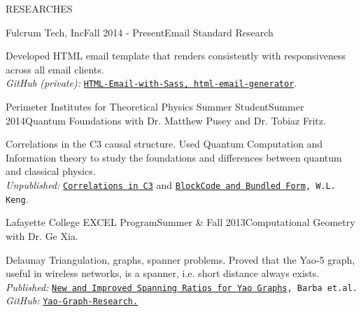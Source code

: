 \documentclass{resume} %
\begin{document}
\begin{rSection}{RESEARCHES}

\begin{rSubsection}{Fulcrum Tech, Inc}{Fall 2014 - Present}{Email Standard Research}{}
\item Developed HTML email template that renders consistently with responsiveness across all email clients.\\
{\em GitHub (private):} {\tt \href{https://github.com/kengz}{HTML-Email-with-Sass, html-email-generator}}.
\end{rSubsection}


\begin{rSubsection}{Perimeter Institutes for Theoretical Physics Summer Student}{Summer 2014}{Quantum Foundations with Dr. Matthew Pusey and Dr. Tobiaz Fritz.}{}
\item Correlations in the C3 causal structure. Used Quantum Computation and Information theory to study the foundations and differences between quantum and classical physics. \\
{\em Unpublished:} {\tt \href{https://github.com/kengz/Quantum-Foundations-Correlations/blob/master/Keng%20Correlations%20in%20C3.pdf}{Correlations in C3}} and {\tt \href{https://github.com/kengz/Quantum-Foundations-Correlations/blob/master/Keng%20blockcode.pdf}{BlockCode and Bundled Form}, W.L. Keng}.
\end{rSubsection}


\begin{rSubsection}{Lafayette College EXCEL Program}{Summer \& Fall 2013}{Computational Geometry with Dr. Ge Xia.}{}
\item Delaunay Triangulation, graphs, spanner problems. Proved that the Yao-5 graph, useful in wireless networks, is a spanner, i.e. short distance always exists.\\
{\em Published:} {\tt \href{http://arxiv.org/abs/1307.5829}{New and Improved Spanning Ratios for Yao Graphs}, Barba et.al.}\\
{\em GitHub:} {\tt \href{https://github.com/kengz/Yao-Graph-Research}{Yao-Graph-Research.}}
\end{rSubsection}


\end{rSection}
\end{document}
